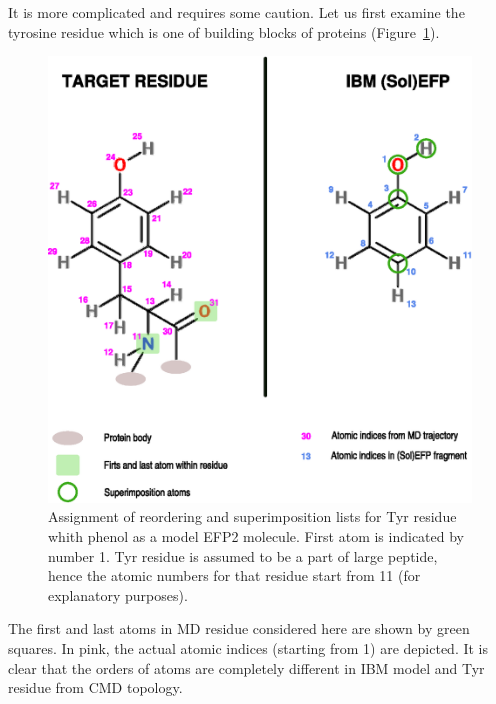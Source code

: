 \documentclass[a4paper,titlepage,twoside,fleqn,12pt]{book}
\begin{document}
\begin{refsection}
It is more complicated and requires some caution. 
Let us first examine the tyrosine residue which is one of
building blocks of proteins (Figure~\ref{f:tyr-res-lists}).
%
\begin{figure}[t!]
\centering
\setlength\fboxsep{0.4pt}
\setlength\fboxrule{0.5pt}
\includegraphics[width=0.92\linewidth]{m.reorder.eps}
\caption{
Assignment of reordering and superimposition lists for Tyr residue
whith phenol as a model EFP2 molecule. First atom is indicated by
number 1.
Tyr residue is assumed to be
a part of large peptide, hence the atomic numbers for that residue start
from 11 (for explanatory purposes).
\label{f:tyr-res-lists}}
\end{figure}
%
The first and last atoms in MD residue considered here are shown by green squares. In pink, the actual
atomic indices (starting from 1) are depicted. It is clear that the orders 
of atoms are completely different in IBM model and Tyr residue from CMD topology.


\end{refsection}
\end{document}

